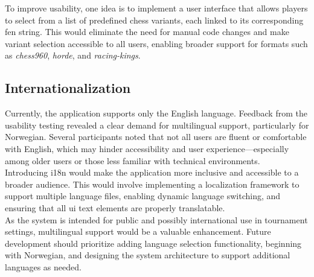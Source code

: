 To improve usability, one idea is to implement a user interface that allows players to select from a list of predefined chess variants, each linked to its corresponding \gls{fen} string. This would eliminate the need for manual code changes and make variant selection accessible to all users, enabling broader support for formats such as \textit{\gls{chess960}}, \textit{\gls{horde}}, and \textit{\gls{racing-kings}}.

\subsection{Internationalization}
Currently, the application supports only the English language. Feedback from the usability testing revealed a clear demand for multilingual support, particularly for Norwegian. Several participants noted that not all users are fluent or comfortable with English, which may hinder accessibility and user experience—especially among older users or those less familiar with technical environments. \\

Introducing \gls{i18n} would make the application more inclusive and accessible to a broader audience. This would involve implementing a localization framework to support multiple language files, enabling dynamic language switching, and ensuring that all \gls{ui} text elements are properly translatable. \\

As the system is intended for public and possibly international use in tournament settings, multilingual support would be a valuable enhancement. Future development should prioritize adding language selection functionality, beginning with Norwegian, and designing the system architecture to support additional languages as needed.
